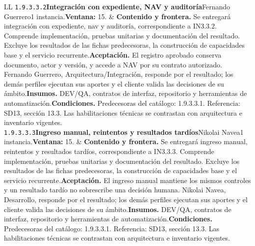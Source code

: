 \begin{longtable}{L{\tabcolsep\relax}L{\tabcolsep\relax}}
\texttt{1.\allowbreak{}9.\allowbreak{}3.\allowbreak{}3.\allowbreak{}2}\newline{}\textbf{Integración con expediente, NAV y auditoría}\newline{}Fernando Guerrero\newline{}1 instancia.\newline{}\textbf{Ventana:} 15. & \textbf{Contenido y frontera.} Se entregará integración con expediente, nav y auditoría, correspondiente a IN3.3.2. Comprende implementación, pruebas unitarias y documentación del resultado. Excluye los resultados de las fichas predecesoras, la construcción de capacidades base y el servicio recurrente.\newline{}\textbf{Aceptación.} El registro aprobado conserva documento, actor y versión, y accede a NAV por su contrato autorizado. Fernando Guerrero, Arquitectura/Integración, responde por el resultado; los demás perfiles ejecutan sus aportes y el cliente valida las decisiones de su ámbito.\newline{}\textbf{Insumos.} DEV/QA, contratos de interfaz, repositorio y herramientas de automatización.\newline{}\textbf{Condiciones.} Predecesoras del catálogo: 1.9.3.3.1. Referencia: SD13, sección 13.3. Las habilitaciones técnicas se contrastan con arquitectura e inventario vigentes.\\\hline
\texttt{1.\allowbreak{}9.\allowbreak{}3.\allowbreak{}3.\allowbreak{}3}\newline{}\textbf{Ingreso manual, reintentos y resultados tardíos}\newline{}Nikolai Navea\newline{}1 instancia.\newline{}\textbf{Ventana:} 15. & \textbf{Contenido y frontera.} Se entregará ingreso manual, reintentos y resultados tardíos, correspondiente a IN3.3.3. Comprende implementación, pruebas unitarias y documentación del resultado. Excluye los resultados de las fichas predecesoras, la construcción de capacidades base y el servicio recurrente.\newline{}\textbf{Aceptación.} El ingreso manual mantiene los mismos controles y un resultado tardío no sobrescribe una decisión humana. Nikolai Navea, Desarrollo, responde por el resultado; los demás perfiles ejecutan sus aportes y el cliente valida las decisiones de su ámbito.\newline{}\textbf{Insumos.} DEV/QA, contratos de interfaz, repositorio y herramientas de automatización.\newline{}\textbf{Condiciones.} Predecesoras del catálogo: 1.9.3.3.1. Referencia: SD13, sección 13.3. Las habilitaciones técnicas se contrastan con arquitectura e inventario vigentes.\\\hline

\end{longtable}
